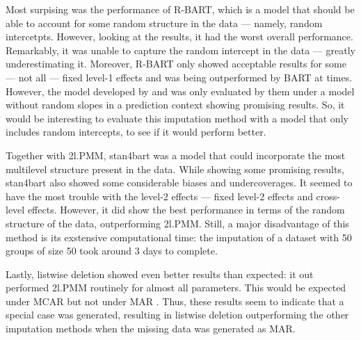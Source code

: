\documentclass[3p,12pt,a4paper]{elsarticle}
\begin{document}
Most surpising was the performance of R-BART, which is a model that should be able to account for some random structure in the data --- namely, random intercetpts. However, looking at the results, it had the worst overall performance. Remarkably, it was unable to capture the random intercept in the data --- greatly underestimating it. Moreover, R-BART only showed acceptable results for some --- not all --- fixed level-1 effects and was being outperformed by BART at times. However, the model developed by \citet{wagner2020,tan2016} and \citet{dorie2024} was only evaluated by them under a model without random slopes in a prediction context showing promising results. So, it would be interesting to evaluate this imputation method with a model that only includes random intercepts, to see if it would perform better. %

Together with 2l.PMM, stan4bart was a model that could incorporate the most multilevel structure present in the data. While showing some promising results, stan4bart also showed some considerable biases and undercoverages. It seemed to have the most trouble with the level-2 effects --- fixed level-2 effects and cross-level effects. However, it did show the best performance in terms of the random structure of the data, outperforming 2l.PMM. Still, a major disadvantage of this method is its exstensive computational time: the imputation of a dataset with 50 groups of size 50 took around 3 days to complete. %

Lastly, listwise deletion showed even better results than expected: it out performed 2l.PMM routinely for almost all parameters. This would be expected under MCAR but not under MAR \citep{buurenFlexibleImputationMissing2018,enders2018a,peeters2015,austin2021,carpenter2013,little2002,grund2018,ludtke2017,grund2021,schouten2021}. Thus, these results seem to indicate that a special case was generated, resulting in listwise deletion outperforming the other imputation methods when the missing data was generated as MAR. %
\end{document}
